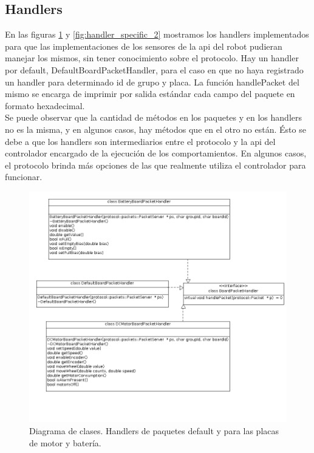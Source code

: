 \subsection{Handlers}
En las figuras \ref{fig:handler_specific_1} y \ref{fig:handler_specific_2}
mostramos los handlers implementados para que las implementaciones de los
sensores de la api del robot pudieran manejar los mismos, sin tener
conocimiento sobre el protocolo. Hay un handler por default,
DefaultBoardPacketHandler, para el caso en que no haya registrado un handler
para determinado id de grupo y placa. La funci\'on handlePacket del mismo
se encarga de imprimir por salida est\'andar cada campo del paquete en
formato hexadecimal.
\\\indent
Se puede observar que la cantidad de m\'etodos en los paquetes y en los
handlers no es la misma, y en algunos casos, hay m\'etodos que en el otro
no est\'an. \'Esto se debe a que los handlers son intermediarios entre
el protocolo y la api del controlador encargado de la ejecuci\'on de los
comportamientos. En algunos casos, el protocolo brinda m\'as opciones de
las que realmente utiliza el controlador para funcionar.
\begin{figure}[ht]
	\centering
	\includegraphics[scale=0.5]{comportamientos/figures/cs5.png}
	\caption[Diagrama de clases: Handlers 1]{Diagrama de clases. Handlers de paquetes default y para las placas de motor y 
	bater\'ia.}
	\label{fig:handler_specific_1}
\end{figure}

